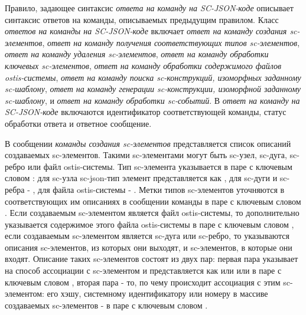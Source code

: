 \begin{scnitemize}
Правило, задающее синтаксис \textit{ответа на команду на SC-JSON-коде} описывает синтаксис ответов на команды,
описываемых предыдущим правилом. Класс \textit{ответов на команды на SC-JSON-коде} включает \textit{ответ на команду
создания sc-элементов}, \textit{ответ на команду получения соответствующих типов sc-элементов}, \textit{ответ на команду
удаления sc-элементов}, \textit{ответ на команду обработки ключевых sc-элементов}, \textit{ответ на команду обработки
содержимого файлов ostis-системы}, \textit{ответ на команду поиска sc-конструкций, изоморфных заданному sc-шаблону},
\textit{ответ на команду генерации sc-конструкции, изоморфной заданному sc-шаблону}, и \textit{ответ на команду
обработки sc-событий}. В \textit{ответ на команду на SC-JSON-коде} включаются идентификатор соответствующей команды,
статус обработки ответа и ответное сообщение.

\begin{scnindent}
	\begin{scnindent}
    \end{scnindent}
\end{scnindent}

В сообщении \textit{команды создания sc-элементов} представляется список описаний создаваемых sc-элементов. Такими
sc-элементами могут быть sc-узел, sc-дуга, sc-ребро или файл ostis-системы. Тип sc-элемента указывается в паре с
ключевым словом : для sc-узла sc-json-тип элемент представляется как , для sc-дуги и sc-ребра -
, для файла ostis-системы - . Метки типов sc-элементов уточняются в соответствующих им описаниях
в сообщении команды в паре с ключевым словом . Если создаваемым sc-элементом является файл ostis-системы, то
дополнительно указывается содержимое этого файла ostis-системы в паре с ключевым словом , если создаваемым
sc-элементом является sc-дуга или sc-ребро, то указываются описания sc-элементов, из которых они выходят, и sc-элементов,
в которые они входят. Описание таких sc-элементов состоят из двух пар: первая пара указывает на способ ассоциации с
sc-элементом и представляется как  или  или  в паре с ключевым словом ,
вторая пара - то, по чему происходит ассоциация с этим sc-элементом: его хэшу, системному идентификатору или номеру
в массиве создаваемых sc-элементов - в паре с ключевым словом .


\end{scnitemize}
